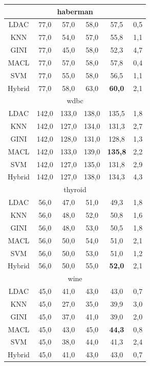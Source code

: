 \begin{longtable}{|c|c|c|c|c|c|}
        \multicolumn{6}{|c|}{haberman} \\ \hline
        LDAC&77,0&57,0&58,0&57,5&0,5\\ \hline
        KNN&77,0&54,0&57,0&55,8&1,1\\ \hline
        GINI&77,0&45,0&58,0&52,3&4,7\\ \hline
        MACL&77,0&57,0&58,0&57,8&0,4\\ \hline
        SVM&77,0&55,0&58,0&56,5&1,1\\ \hline
        Hybrid&77,0&58,0&63,0&\textbf{60,0}&2,1\\ \hline \hline

        \multicolumn{6}{|c|}{wdbc} \\ \hline
        LDAC&142,0&133,0&138,0&135,5&1,8\\ \hline
        KNN&142,0&127,0&134,0&131,3&2,7\\ \hline
        GINI&142,0&128,0&131,0&128,8&1,3\\ \hline
        MACL&142,0&133,0&139,0&\textbf{135,8}&2,2\\ \hline
        SVM&142,0&127,0&135,0&131,8&2,9\\ \hline
        Hybrid&142,0&127,0&138,0&134,3&4,3\\ \hline \hline

        \multicolumn{6}{|c|}{thyroid} \\ \hline
        LDAC&56,0&47,0&51,0&49,3&1,8\\ \hline
        KNN&56,0&48,0&52,0&50,8&1,6\\ \hline
        GINI&56,0&48,0&53,0&50,5&1,8\\ \hline
        MACL&56,0&50,0&54,0&51,0&2,1\\ \hline
        SVM&56,0&50,0&53,0&51,0&1,2\\ \hline
        Hybrid&56,0&50,0&55,0&\textbf{52,0}&2,1\\ \hline \hline

        \multicolumn{6}{|c|}{wine} \\ \hline
        LDAC&45,0&41,0&43,0&43,0&0,7\\ \hline
        KNN&45,0&27,0&35,0&39,9&3,0\\ \hline
        GINI&45,0&37,0&41,0&39,0&2,0\\ \hline
        MACL&45,0&43,0&45,0&\textbf{44,3}&0,8\\ \hline
        SVM&45,0&38,0&44,0&41,3&2,4\\ \hline
        Hybrid&45,0&41,0&43,0&43,0&0,7\\ \hline
\end{longtable}

